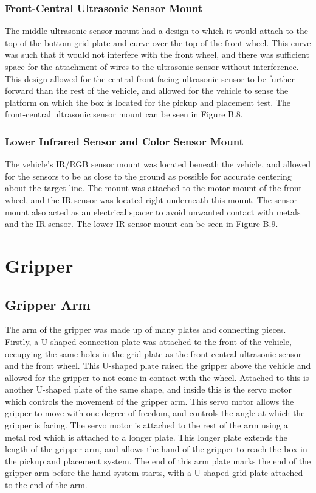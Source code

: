 \documentclass[11pt]{report}
\begin{document}
\subsubsection{Front-Central Ultrasonic Sensor Mount}
The middle ultrasonic sensor mount had a design to which it would attach to the top of the bottom grid plate and curve over the top of the front wheel. This curve was such that it would not interfere with the front wheel, and there was sufficient space for the attachment of wires to the ultrasonic sensor without interference. This design allowed for the central front facing ultrasonic sensor to be further forward than the rest of the vehicle, and allowed for the vehicle to sense the platform on which the box is located for the pickup and placement test. The front-central ultrasonic sensor mount can be seen in Figure B.8.

\subsubsection{Lower Infrared Sensor and Color Sensor Mount}
The vehicle’s \gls{IR}/\gls{RGB} sensor mount was located beneath the vehicle, and allowed for the sensors to be as close to the ground as possible for accurate centering about the target-line. The mount was attached to the motor mount of the front wheel, and the \gls{IR} sensor was located right underneath this mount. The sensor mount also acted as an electrical spacer to avoid unwanted contact with metals and the \gls{IR} sensor. The lower \gls{IR} sensor mount can be seen in Figure B.9. 

\section{Gripper}\label{sec:gripper}
\subsection{Gripper Arm}
The arm of the gripper was made up of many plates and connecting pieces. Firstly, a U-shaped connection plate was attached to the front of the vehicle, occupying the same holes in the grid plate as the front-central ultrasonic sensor and the front wheel. This U-shaped plate raised the gripper above the vehicle and allowed for the gripper to not come in contact with the wheel. Attached to this is another U-shaped plate of the same shape, and inside this is the servo motor which controls the movement of the gripper arm. This servo motor allows the gripper to move with one degree of freedom, and controls the angle at which the gripper is facing. The servo motor is attached to the rest of the arm using a metal rod which is attached to a longer plate. This longer plate extends the length of the gripper arm, and allows the hand of the gripper to reach the box in the pickup and placement system. The end of this arm plate marks the end of the gripper arm before the hand system starts, with a U-shaped grid plate attached to the end of the arm. 
\end{document}
